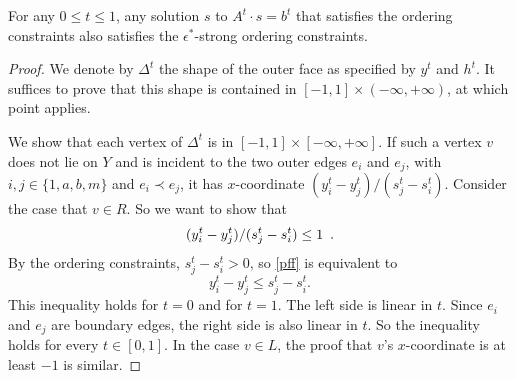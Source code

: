 


\begin{lem}
   For any $0\le t\le 1$, any solution $s$ to $A^t\cdot s = b^t$
   that satisfies the ordering constraints also satisfies the
   $\epsilon^*$-strong ordering constraints. 
\end{lem}

\begin{proof}
We denote by $\Delta^t$ the shape of the outer face as specified by
$y^t$ and $h^t$.  
It suffices to prove that this shape
is contained in
$[-1,1]\times(-\infty,+\infty)$,
at which point  applies.

We show that each vertex of $\Delta^t$ is in $[-1,1]\times[-\infty,+\infty]$.
If such a vertex $v$ does not lie on $Y$ and is incident to
the two outer edges
$e_i$ and $e_j$, with $i,j\in \{1,a,b,m\}$ and $e_i \prec e_j$, it
has $x$-coordinate $( y_i^t - y_j^t ) / ( s_j^t - 
s_i^t )$.
Consider the case that $v\in R$. So we want to show that
\begin{equation}
( y_i^t - y_j^t ) / ( s_j^t - s_i^t )  \le 1 \enspace . \eqlabel{pff}
\end{equation}
By the ordering constraints, $s_j^t - s_i^t > 0$, so \eqref{pff} is
equivalent to
\begin{equation*}
  y_i^t - y_j^t  \le  s_j^t - s_i^t.
\end{equation*}
This inequality holds for $t=0$ and for $t=1$. The left side is linear
in $t$.
Since $e_i$ and $e_j$ are boundary edges, the right side is also
linear in $t$.
So the inequality holds for 
every $t\in [0,1]$.
In the case $v\in L$, the proof that $v$'s $x$-coordinate is at 
least $-1$ is similar.
\end{proof}


